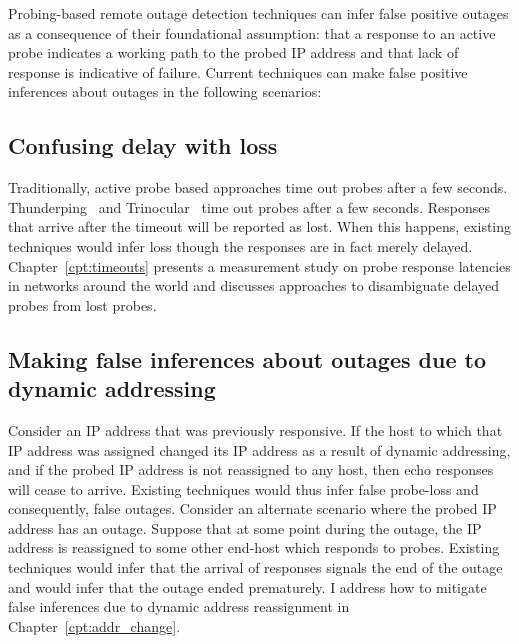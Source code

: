 Probing-based remote outage detection techniques can infer false
positive outages as a consequence of their foundational assumption:
that a response to an active probe indicates a working path to the
probed IP address and that lack of response is indicative of
failure. Current techniques can make false positive inferences about
outages in the following scenarios:



\subsection{Confusing delay with loss}

Traditionally, active probe based approaches time out probes after a
few seconds. Thunderping~\cite{pingin} and
Trinocular~\cite{trinocular} time out probes after a few
seconds. Responses that arrive after the timeout will be reported as
lost. When this happens, existing techniques would infer loss though
the responses are in fact merely delayed. Chapter~\ref{cpt:timeouts}
presents a measurement study on probe response latencies in networks
around the world and discusses approaches to disambiguate delayed
probes from lost probes.


\subsection{Making false inferences about outages due to dynamic
      addressing}

 Consider an IP address that was previously responsive. If the host
to which that IP address was assigned changed its IP address as a
result of dynamic addressing, and if the probed IP address is not
reassigned to any host, then echo responses will cease to
arrive. Existing techniques would thus infer false probe-loss and
consequently, false outages. Consider an alternate scenario where the
probed IP address has an outage. Suppose that at some point during the
outage, the IP address is reassigned to some other end-host which
responds to probes. Existing techniques would infer that the arrival
of responses signals the end of the outage and would infer that the
outage ended prematurely.  I address how to mitigate false inferences
due to dynamic address reassignment in Chapter~\ref{cpt:addr_change}.

